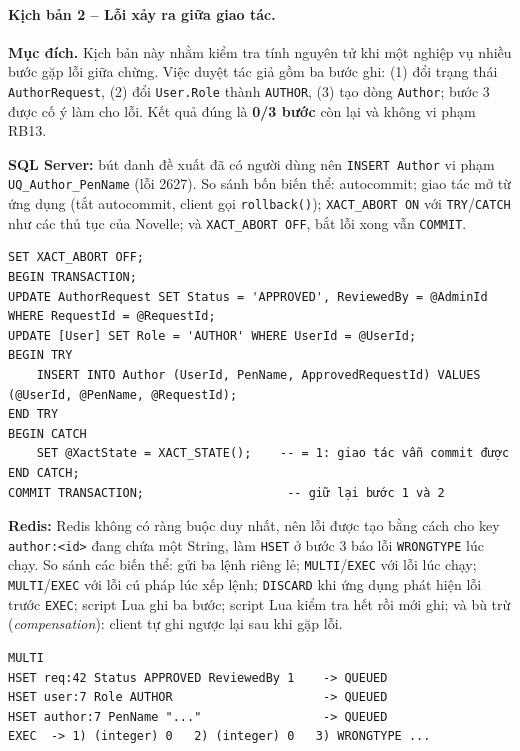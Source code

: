 \paragraph{Kịch bản 2 -- Lỗi xảy ra giữa giao tác.}

\textbf{Mục đích.} Kịch bản này nhằm kiểm tra tính nguyên tử khi một nghiệp vụ nhiều bước gặp lỗi giữa chừng. Việc duyệt tác giả gồm ba bước ghi: (1) đổi trạng thái \texttt{AuthorRequest}, (2) đổi \texttt{User.Role} thành \texttt{AUTHOR}, (3) tạo dòng \texttt{Author}; bước 3 được cố ý làm cho lỗi. Kết quả đúng là \textbf{0/3 bước} còn lại và không vi phạm RB13.

\textbf{SQL Server:} bút danh đề xuất đã có người dùng nên \texttt{INSERT Author} vi phạm \texttt{UQ\_Author\_PenName} (lỗi 2627). So sánh bốn biến thể: autocommit; giao tác mở từ ứng dụng (tắt autocommit, client gọi \texttt{rollback()}); \texttt{XACT\_ABORT ON} với \texttt{TRY}/\texttt{CATCH} như các thủ tục của Novelle; và \texttt{XACT\_ABORT OFF}, bắt lỗi xong vẫn \texttt{COMMIT}.

\begin{verbatim}
SET XACT_ABORT OFF;
BEGIN TRANSACTION;
UPDATE AuthorRequest SET Status = 'APPROVED', ReviewedBy = @AdminId WHERE RequestId = @RequestId;
UPDATE [User] SET Role = 'AUTHOR' WHERE UserId = @UserId;
BEGIN TRY
    INSERT INTO Author (UserId, PenName, ApprovedRequestId) VALUES (@UserId, @PenName, @RequestId);
END TRY
BEGIN CATCH
    SET @XactState = XACT_STATE();    -- = 1: giao tác vẫn commit được
END CATCH;
COMMIT TRANSACTION;                    -- giữ lại bước 1 và 2
\end{verbatim}

\textbf{Redis:} Redis không có ràng buộc duy nhất, nên lỗi được tạo bằng cách cho key \texttt{author:<id>} đang chứa một String, làm \texttt{HSET} ở bước 3 báo lỗi \texttt{WRONGTYPE} lúc chạy. So sánh các biến thể: gửi ba lệnh riêng lẻ; \texttt{MULTI}/\texttt{EXEC} với lỗi lúc chạy; \texttt{MULTI}/\texttt{EXEC} với lỗi cú pháp lúc xếp lệnh; \texttt{DISCARD} khi ứng dụng phát hiện lỗi trước \texttt{EXEC}; script Lua ghi ba bước; script Lua kiểm tra hết rồi mới ghi; và bù trừ (\emph{compensation}): client tự ghi ngược lại sau khi gặp lỗi.

\begin{verbatim}
MULTI
HSET req:42 Status APPROVED ReviewedBy 1    -> QUEUED
HSET user:7 Role AUTHOR                     -> QUEUED
HSET author:7 PenName "..."                 -> QUEUED
EXEC  -> 1) (integer) 0   2) (integer) 0   3) WRONGTYPE ...
\end{verbatim}

